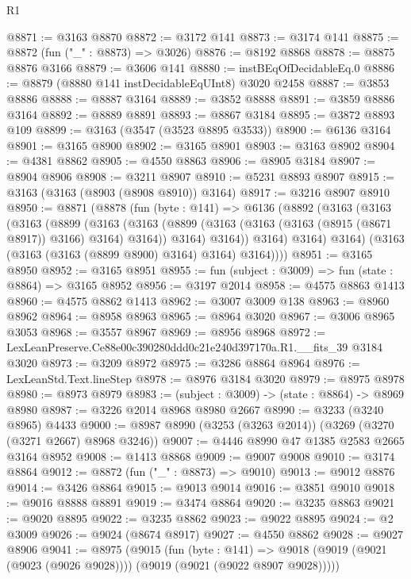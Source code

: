 \begin{lexlean}{R1}
\begin{coremodule}
@8871 := @3163 @8870
@8872 := @3172 @141
@8873 := @3174 @141
@8875 := @8872 (fun ("_" : @8873) => @3026)
@8876 := @8192 @8868
@8878 := @8875 @8876 @3166
@8879 := @3606 @141
@8880 := instBEqOfDecidableEq.{0}
@8886 := @8879 (@8880 @141 instDecidableEqUInt8) @3020 @2458
@8887 := @3853 @8886
@8888 := @8887 @3164
@8889 := @3852 @8888
@8891 := @3859 @8886 @3164
@8892 := @8889 @8891
@8893 := @8867 @3184
@8895 := @3872 @8893 @109
@8899 := @3163 (@3547 (@3523 @8895 @3533))
@8900 := @6136 @3164
@8901 := @3165 @8900
@8902 := @3165 @8901
@8903 := @3163 @8902
@8904 := @4381 @8862
@8905 := @4550 @8863
@8906 := @8905 @3184
@8907 := @8904 @8906
@8908 := @3211 @8907
@8910 := @5231 @8893 @8907
@8915 := @3163 (@3163 (@8903 (@8908 @8910)) @3164)
@8917 := @3216 @8907 @8910
@8950 := @8871
    (@8878
      (fun (byte : @141) =>
      @6136
        (@8892
          (@3163
            (@3163
              (@3163
                (@8899
                  (@3163
                    (@3163
                      (@8899 (@3163 (@3163 (@3163 (@8915 (@8671 @8917)) @3166) @3164) @3164))
                      @3164)
                    @3164))
                @3164)
              @3164)
            @3164)
          (@3163 (@3163 (@3163 (@8899 @8900) @3164) @3164) @3164))))
@8951 := @3165 @8950
@8952 := @3165 @8951
@8955 := fun (subject : @3009) => fun (state : @8864) => @3165 @8952
@8956 := @3197 @2014
@8958 := @4575 @8863 @1413
@8960 := @4575 @8862 @1413
@8962 := @3007 @3009 @138
@8963 := @8960 @8962
@8964 := @8958 @8963
@8965 := @8964 @3020
@8967 := @3006 @8965 @3053
@8968 := @3557 @8967
@8969 := @8956 @8968
@8972 := LexLeanPreserve.Ce88e00c390280ddd0c21e240d397170a.R1.__fits_39 @3184 @3020
@8973 := @3209 @8972
@8975 := @3286 @8864 @8964
@8976 := LexLeanStd.Text.lineStep
@8978 := @8976 @3184 @3020
@8979 := @8975 @8978
@8980 := @8973 @8979
@8983 := (subject : @3009) -> (state : @8864) -> @8969 @8980
@8987 := @3226 @2014 @8968 @8980 @2667
@8990 := @3233 (@3240 @8965) @4433
@9000 := @8987 @8990 (@3253 (@3263 @2014)) (@3269 (@3270 (@3271 @2667) @8968 @3246))
@9007 := @4446 @8990 @47 @1385 @2583 @2665 @3164 @8952
@9008 := @1413 @8868
@9009 := @9007 @9008
@9010 := @3174 @8864
@9012 := @8872 (fun ("_" : @8873) => @9010)
@9013 := @9012 @8876
@9014 := @3426 @8864
@9015 := @9013 @9014
@9016 := @3851 @9010
@9018 := @9016 @8888 @8891
@9019 := @3474 @8864
@9020 := @3235 @8863
@9021 := @9020 @8895
@9022 := @3235 @8862
@9023 := @9022 @8895
@9024 := @2 @3009
@9026 := @9024 (@8674 @8917)
@9027 := @4550 @8862
@9028 := @9027 @8906
@9041 := @8975
    (@9015
      (fun (byte : @141) =>
      @9018 (@9019 (@9021 (@9023 (@9026 @9028)))) (@9019 (@9021 (@9022 @8907 @9028)))))

\end{coremodule}
\end{lexlean}
